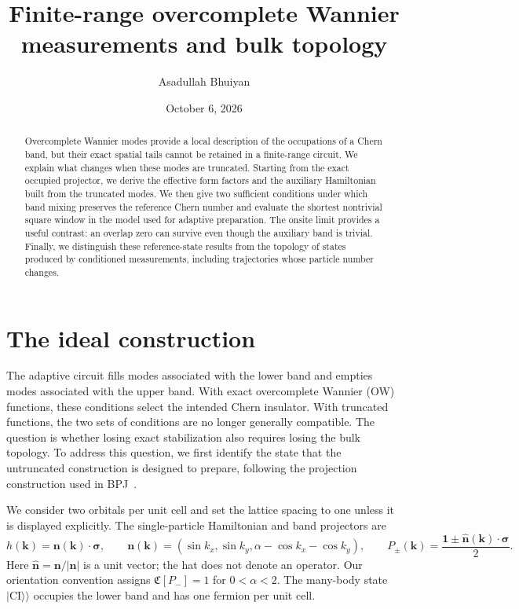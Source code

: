 \documentclass[aps,prb,onecolumn,nofootinbib,superscriptaddress]{revtex4-2}
\newcommand{\id}{\mathbf{1}}
\newcommand{\Ch}{\mathfrak C}
\newcommand{\bk}{\boldsymbol k}
\newcommand{\kett}[1]{\lvert#1\rangle\!\rangle}
\begin{document}
\title{Finite-range overcomplete Wannier measurements and bulk topology}
\author{Asadullah Bhuiyan}
\noaffiliation
\date{October 6, 2026}
\begin{abstract}
Overcomplete Wannier modes provide a local description of the occupations of a
Chern band, but their exact spatial tails cannot be retained in a finite-range
circuit. We explain what changes when these modes are truncated. Starting from
the exact occupied projector, we derive the effective form factors and the
auxiliary Hamiltonian built from the truncated modes. We then give two sufficient
conditions under which band mixing preserves the reference Chern number and
evaluate the shortest nontrivial square window in the model used for adaptive
preparation. The onsite limit provides a useful contrast: an overlap zero can
survive even though the auxiliary band is trivial. Finally, we distinguish these
reference-state results from the topology of states produced by conditioned
measurements, including trajectories whose particle number changes.
\end{abstract}
\maketitle
\setcounter{tocdepth}{2}
\tableofcontents

\section{The ideal construction}
\label{sec:ideal}

The adaptive circuit fills modes associated with the lower band and empties
modes associated with the upper band. With exact overcomplete Wannier (OW)
functions, these conditions select the intended Chern insulator. With truncated
functions, the two sets of conditions are no longer generally compatible. The
question is whether losing exact stabilization also requires losing the bulk
topology. To address this question, we first identify the state that the
untruncated construction is designed to prepare, following the projection
construction used in BPJ~\cite{BPJ}.

We consider two orbitals per unit cell and set the lattice spacing to one unless
it is displayed explicitly. The single-particle Hamiltonian and band projectors
are
\begin{equation}
 h(\bk)=\boldsymbol n(\bk)\cdot\boldsymbol\sigma,\qquad
 \boldsymbol n(\bk)=(\sin k_x,\sin k_y,\alpha-\cos k_x-\cos k_y),\qquad
 P_\pm(\bk)=\frac{\id\pm\widehat{\boldsymbol n}(\bk)\cdot\boldsymbol\sigma}{2}.
 \label{eq:model}
\end{equation}
Here $\widehat{\boldsymbol n}=\boldsymbol n/|\boldsymbol n|$ is a unit vector;
the hat does not denote an operator. Our orientation convention assigns
$\Ch[P_-]=1$ for $0<\alpha<2$. The many-body state
$\kett{\mathrm{CI}}$ occupies the lower band and has one fermion per unit cell.
\end{document}
